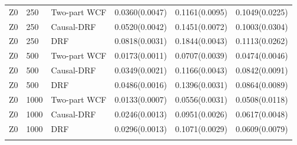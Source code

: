 \begin{longtable}{lllrrr}
\addlinespace
Z0 & 250 & Two-part WCF & 0.0360(0.0047) & 0.1161(0.0095) & 0.1049(0.0225) \\
Z0 & 250 & Causal-DRF & 0.0520(0.0042) & 0.1451(0.0072) & 0.1003(0.0304) \\
Z0 & 250 & DRF & 0.0818(0.0031) & 0.1844(0.0043) & 0.1113(0.0262) \\
\addlinespace
Z0 & 500 & Two-part WCF & 0.0173(0.0011) & 0.0707(0.0039) & 0.0474(0.0046) \\
Z0 & 500 & Causal-DRF & 0.0349(0.0021) & 0.1166(0.0043) & 0.0842(0.0091) \\
Z0 & 500 & DRF & 0.0486(0.0016) & 0.1396(0.0031) & 0.0864(0.0089) \\
\addlinespace
Z0 & 1000 & Two-part WCF & 0.0133(0.0007) & 0.0556(0.0031) & 0.0508(0.0118) \\
Z0 & 1000 & Causal-DRF & 0.0246(0.0013) & 0.0951(0.0026) & 0.0617(0.0048) \\
Z0 & 1000 & DRF & 0.0296(0.0013) & 0.1071(0.0029) & 0.0609(0.0079) \\
\addlinespace
\midrule
\bottomrule
\end{longtable}
\endgroup
